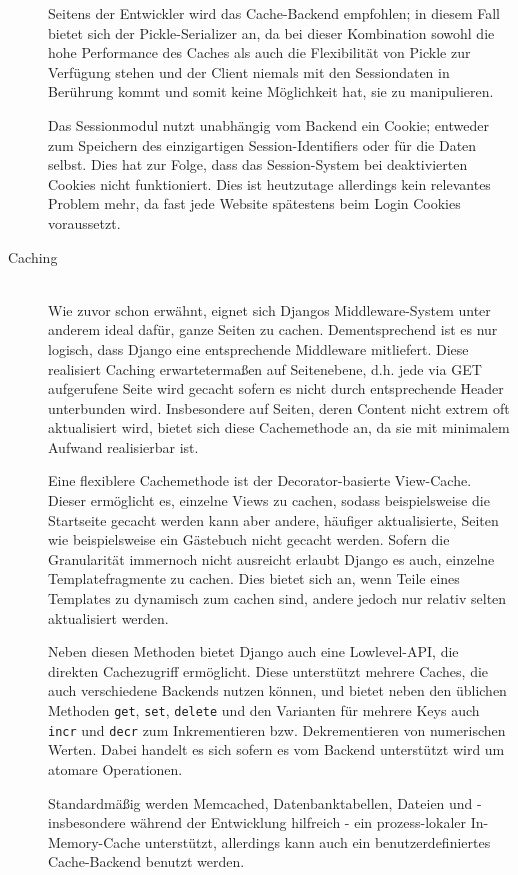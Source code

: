 \begin{description}
Seitens der Entwickler wird das Cache-Backend empfohlen; in diesem Fall bietet sich der
Pickle-Serializer an, da bei dieser Kombination sowohl die hohe Performance des Caches als auch die
Flexibilität von Pickle zur Verfügung stehen und der Client niemals mit den Sessiondaten in
Berührung kommt und somit keine Möglichkeit hat, sie zu manipulieren.

Das Sessionmodul nutzt unabhängig vom Backend ein Cookie; entweder zum Speichern des einzigartigen
Session-Identifiers oder für die Daten selbst. Dies hat zur Folge, dass das Session-System bei
deaktivierten Cookies nicht funktioniert. Dies ist heutzutage allerdings kein relevantes Problem
mehr, da fast jede Website spätestens beim Login Cookies voraussetzt.


\item[Caching] \hfill \\
Wie zuvor schon erwähnt, eignet sich Djangos Middleware-System unter anderem ideal dafür, ganze
Seiten zu cachen. Dementsprechend ist es nur logisch, dass Django eine entsprechende Middleware
mitliefert.  Diese realisiert Caching erwartetermaßen auf Seitenebene, d.h. jede via GET aufgerufene
Seite wird gecacht sofern es nicht durch entsprechende Header unterbunden wird. Insbesondere auf
Seiten, deren Content nicht extrem oft aktualisiert wird, bietet sich diese Cachemethode an, da sie
mit minimalem Aufwand realisierbar ist.

Eine flexiblere Cachemethode ist der Decorator-basierte View-Cache. Dieser ermöglicht es, einzelne
Views zu cachen, sodass beispielsweise die Startseite gecacht werden kann aber andere, häufiger
aktualisierte, Seiten wie beispielsweise ein Gästebuch nicht gecacht werden. Sofern die Granularität
immernoch nicht ausreicht erlaubt Django es auch, einzelne Templatefragmente zu cachen. Dies bietet
sich an, wenn Teile eines Templates zu dynamisch zum cachen sind, andere jedoch nur relativ selten
aktualisiert werden.

Neben diesen Methoden bietet Django auch eine Lowlevel-API, die direkten Cachezugriff ermöglicht.
Diese unterstützt mehrere Caches, die auch verschiedene Backends nutzen können, und bietet neben den
üblichen Methoden \lstinline{get}, \lstinline{set}, \lstinline{delete} und den Varianten für mehrere
Keys auch \lstinline{incr} und \lstinline{decr} zum Inkrementieren bzw. Dekrementieren von
numerischen Werten. Dabei handelt es sich sofern es vom Backend unterstützt wird um atomare
Operationen.

Standardmäßig werden Memcached, Datenbanktabellen, Dateien und - insbesondere während der
Entwicklung hilfreich - ein prozess-lokaler In-Memory-Cache unterstützt, allerdings kann auch ein
benutzerdefiniertes Cache-Backend benutzt werden.



\end{description}
